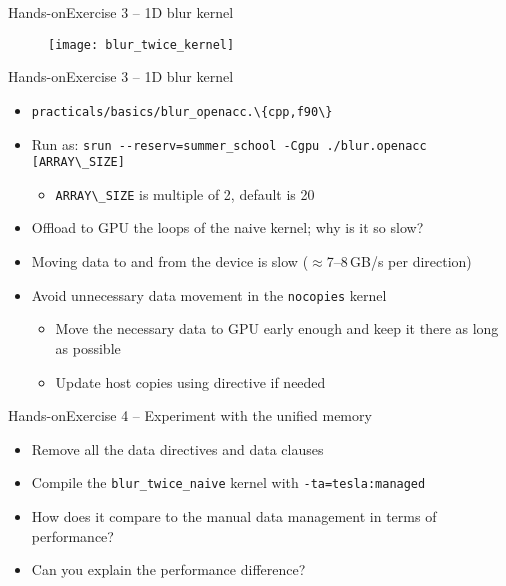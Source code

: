 \documentclass[12pt,aspectratio=169]{beamer}
\newcommand\shinline[2][]{\lstinline[style=shstyle,basicstyle=\ttfamily,#1]!#2!}
\begin{document}
\begin{frame}{Hands-on}{Exercise 3 -- 1D blur kernel}
  \begin{figure}
    \centering
    \texttt{[image: blur\_twice\_kernel]}
  \end{figure}
\end{frame}


\begin{frame}{Hands-on}{Exercise 3 -- 1D blur kernel}
  \begin{itemize}
  \item \shinline{practicals/basics/blur_openacc.\{cpp,f90\}}
  \item Run as: \shinline{srun --reserv=summer_school -Cgpu ./blur.openacc [ARRAY\_SIZE]}
    \begin{itemize}
    \item \shinline{ARRAY\_SIZE} is multiple of 2, default is 20
    \end{itemize}
  \item Offload to GPU the loops of the naive kernel; why is it so slow?
    \pause
    \vfill
  \item Moving data to and from the device is slow ($\approx$7--8\,GB/s per direction)
  \item Avoid unnecessary data movement in the \texttt{nocopies} kernel
    \begin{itemize}
    \item Move the necessary data to GPU early enough and keep it there as long as possible
    \item Update host copies using  directive if needed
    \end{itemize}
  \end{itemize}
\end{frame}


\begin{frame}{Hands-on}{Exercise 4 -- Experiment with the unified memory}
  \begin{itemize}
  \item Remove all the data directives and data clauses
  \item Compile the \texttt{blur\_twice\_naive} kernel with \texttt{-ta=tesla:managed}
  \item How does it compare to the manual data management in terms of performance?
  \item Can you explain the performance difference?
  \end{itemize}
\end{frame}
\end{document}
